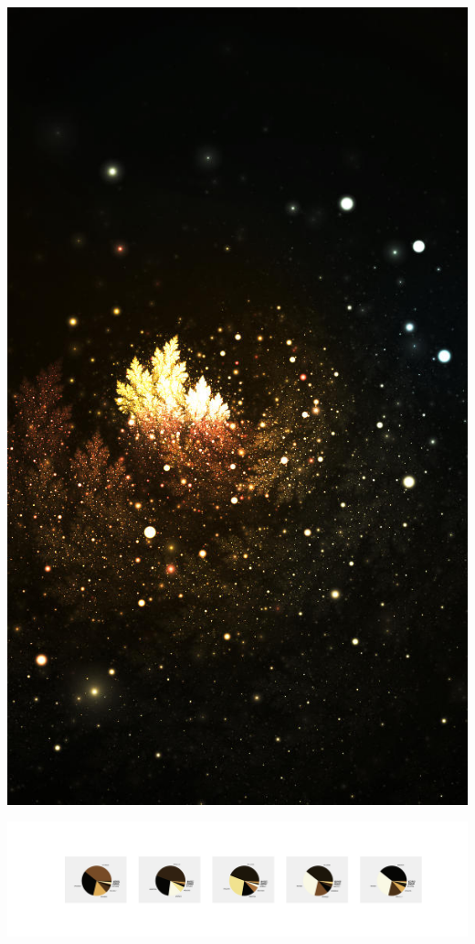 \documentclass[11pt]{article}
\begin{document}
\begin{landscape}
    \begin{center}
    \includegraphics[width=\textwidth]{./nbimg/file (116).jpg}
    \end{center}

    \begin{center}
    \includegraphics[width=250mm]{./nbimg/pie-19.jpg}
    \end{center}


\end{landscape}
\end{document}

